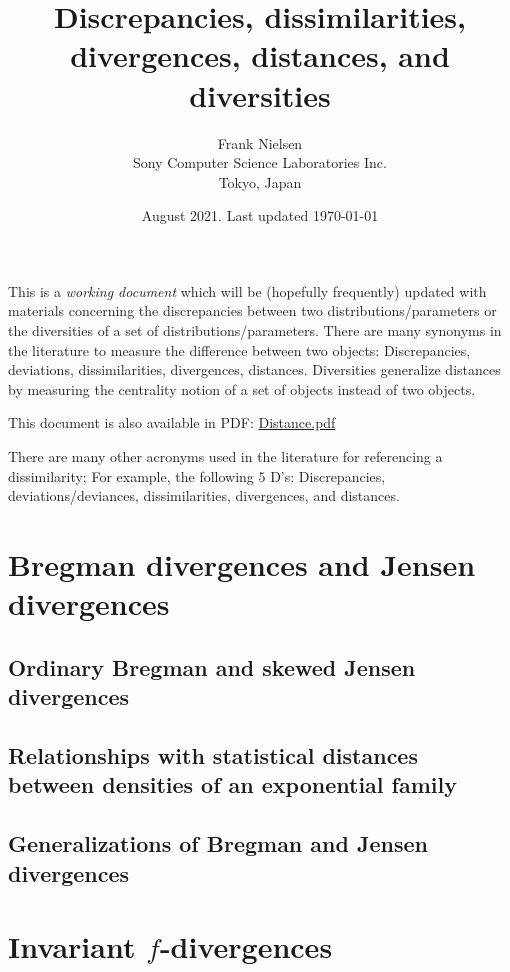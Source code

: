 \documentclass[11pt]{article}
\title{Discrepancies, dissimilarities, divergences, distances, and diversities}
\date{August 2021. Last updated \today}
\author{Frank Nielsen\\ Sony Computer Science Laboratories Inc.\\ Tokyo, Japan}
\begin{document}
\maketitle

This is a {\em working document} which will be (hopefully frequently) updated with materials concerning the discrepancies between two distributions/parameters or the diversities of a set of distributions/parameters.
There are many synonyms in the literature to measure the difference between two objects: 
Discrepancies, deviations, dissimilarities, divergences, distances. 
Diversities generalize distances by measuring the centrality notion of a set of objects instead of two objects.

\vskip 0.5cm
This document is also available in PDF: \url{Distance.pdf} 
\vskip 0.5cm

There are many other acronyms used in the literature for referencing a dissimilarity; For example, the following $5$ D's:
Discrepancies, deviations/deviances, dissimilarities, divergences, and distances.



\tableofcontents

\section{Bregman divergences and Jensen divergences}

\subsection{Ordinary Bregman and skewed Jensen divergences}

\subsection{Relationships with statistical distances between densities of an exponential family}

\subsection{Generalizations of Bregman and Jensen divergences}




\section{Invariant {\protect $f$-divergences}}
\end{document}
